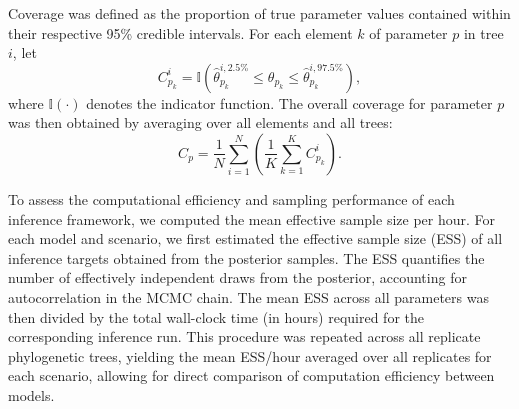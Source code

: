 Coverage was defined as the proportion of true parameter values contained within their respective 95\% credible intervals.
For each element \( k \) of parameter \( p \) in tree \( i \), let
\[
    C_{p_k}^i = \mathbb{I}\!\left( \hat{\theta}_{p_k}^{i,2.5\%} \leq \theta_{p_k} \leq \hat{\theta}_{p_k}^{i,97.5\%} \right),
\]
where \( \mathbb{I}(\cdot) \) denotes the indicator function.
The overall coverage for parameter \( p \) was then obtained by averaging over all elements and all trees:
\[
    C_p = \frac{1}{N} \sum_{i=1}^{N} \left( \frac{1}{K} \sum_{k=1}^{K} C_{p_k}^i \right).
\]


To assess the computational efficiency and sampling performance of each inference framework, we computed the mean effective sample size per hour.
For each model and scenario, we first estimated the effective sample size (ESS) \cite{gelman1995bayesian} of all inference targets obtained from the posterior samples.
The ESS quantifies the number of effectively independent draws from the posterior, accounting for autocorrelation in the MCMC chain.
The mean ESS across all parameters was then divided by the total wall-clock time (in hours) required for the corresponding inference run.
This procedure was repeated across all replicate phylogenetic trees, yielding the mean ESS/hour averaged over all replicates for each scenario, allowing for direct comparison of computation efficiency between models.